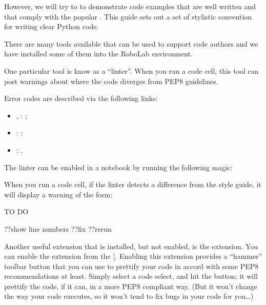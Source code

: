 \documentclass[letterpaper,10pt,english]{sphinxmanual}
\begin{document}
However, we will try to to demonstrate code examples that are well written and that comply with the popular . This guide sets out a set of stylistic convention for writing clear Python code.

There are many tools available that can be used to support code authors and we have installed some of them into the RoboLab environment.

One particular tool is know as a “linter”. When you run a code cell, this tool can post warnings about where the code diverges from PEP\sphinxhyphen{}8 guidelines.

Error codes are described via the following links:
\begin{itemize}
\item {} 
, : ;

\item {} 
: ;

\item {} 
: .

\end{itemize}

The linter can be enabled in a notebook by running the following magic:



When you run a code cell, if the linter detects a difference from the style guide, it will display a warning of the form:

TO DO

??show line numbers ??fix ??rerun

Another useful extension that is installed, but not enabled, is the  extension. You can enable the extension from the  {[}\sphinxhref{/nbextensions/?nbextension=code\_prettify/autopep8}{direct link}{]}. Enabling this extension provides a “hammer” toolbar button that you can use to prettify your code in accord with some PEP\sphinxhyphen{}8 recommendations at least. Simply select a code select, and hit the button; it will prettify the code, if it can, in a more PEP\sphinxhyphen{}8 compliant way.
(But it won’t change the way your code executes, so it won’t tend to fix bugs in your code for you…)
\end{document}
